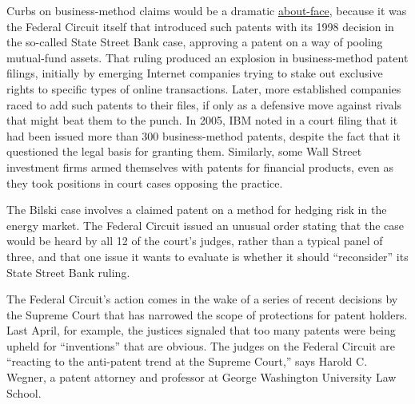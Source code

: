 \documentclass[12pt,a4paper]{article}
\begin{document}
\begin{reading}
\begin{examtext}
Curbs on business-method claims would be a dramatic \uline{about-face}, because it was the Federal Circuit itself that introduced such patents with its 1998 decision in the so-called State Street Bank case, approving a patent on a way of pooling mutual-fund assets. That ruling produced an explosion in business-method patent filings, initially by emerging Internet companies trying to stake out exclusive rights to specific types of online transactions. Later, more established companies raced to add such patents to their files, if only as a defensive move against rivals that might beat them to the punch. In 2005, IBM noted in a court filing that it had been issued more than 300 business-method patents, despite the fact that it questioned the legal basis for granting them. Similarly, some Wall Street investment firms armed themselves with patents for financial products, even as they took positions in court cases opposing the practice.

The Bilski case involves a claimed patent on a method for hedging risk in the energy market. The Federal Circuit issued an unusual order stating that the case would be heard by all 12 of the court's judges, rather than a typical panel of three, and that one issue it wants to evaluate is whether it should ``reconsider'' its State Street Bank ruling.

The Federal Circuit's action comes in the wake of a series of recent decisions by the Supreme Court that has narrowed the scope of protections for patent holders. Last April, for example, the justices signaled that too many patents were being upheld for ``inventions'' that are obvious. The judges on the Federal Circuit are ``reacting to the anti-patent trend at the Supreme Court,'' says Harold C. Wegner, a patent attorney and professor at George Washington University Law School.
\end{examtext}





\end{reading}
\end{document}
